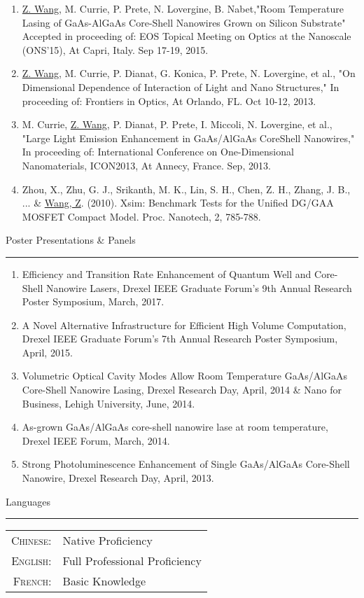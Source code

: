 \begin{vita}
\begin{enumerate}
\item \underline{Z. Wang}, M. Currie, P. Prete, N. Lovergine, B. Nabet,"Room Temperature Lasing of GaAs-AlGaAs Core-Shell Nanowires Grown on Silicon Substrate" Accepted in proceeding of:  EOS Topical Meeting on Optics at the Nanoscale  (ONS’15), At Capri, Italy. Sep 17-19, 2015.
\item \underline{Z. Wang}, M. Currie, P. Dianat, G. Konica, P. Prete, N. Lovergine, et al., "On Dimensional Dependence of Interaction of Light and Nano Structures," In proceeding of: Frontiers in Optics, At Orlando, FL. Oct 10-12, 2013.
\item M. Currie, \underline{Z. Wang}, P. Dianat, P. Prete, I. Miccoli, N. Lovergine, et al., "Large Light Emission Enhancement in GaAs/AlGaAs CoreShell Nanowires," In proceeding of: International Conference on One-Dimensional Nanomaterials, ICON2013, At Annecy, France. Sep, 2013.
\item Zhou, X., Zhu, G. J., Srikanth, M. K., Lin, S. H., Chen, Z. H., Zhang, J. B., ... \& \underline{Wang, Z}. (2010). Xsim: Benchmark Tests for the Unified DG/GAA MOSFET Compact Model. Proc. Nanotech, 2, 785-788.
\end{enumerate}

{\Large\scshape\raggedright{Poster Presentations \& Panels}}
\newline
\rule{\textwidth}{1pt}
\begin{enumerate}
\item Efficiency and Transition Rate Enhancement of Quantum Well and Core-Shell Nanowire Lasers, Drexel IEEE Graduate Forum’s 9th Annual Research Poster Symposium, March, 2017.
\item A Novel Alternative Infrastructure for Efficient High Volume Computation, Drexel IEEE Graduate Forum’s 7th Annual Research Poster Symposium, April, 2015.
\item Volumetric Optical Cavity Modes Allow Room Temperature GaAs/AlGaAs Core-Shell Nanowire Lasing, Drexel Research Day, April, 2014 \& Nano for Business, Lehigh University, June, 2014.
\item As-grown GaAs/AlGaAs core-shell nanowire lase at room temperature, Drexel IEEE Forum, March, 2014.
\item Strong Photoluminescence Enhancement of Single GaAs/AlGaAs Core-Shell Nanowire, Drexel Research Day, April, 2013.
\end{enumerate}


{\Large\scshape\raggedright{Languages}}
\newline
\rule{\textwidth}{1pt}
\begin{tabular}{rl}
\textsc{Chinese:}&Native Proficiency\\
\textsc{English:}&Full Professional Proficiency\\
\textsc{French:}&Basic Knowledge\\
\end{tabular}



\end{vita}
